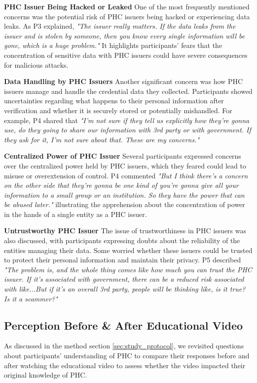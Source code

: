 \textbf{PHC Issuer Being Hacked or Leaked} One of the most frequently mentioned concerns was the potential risk of PHC issuers being hacked or experiencing data leaks. As P3 explained, \textit{"The issuer really matters. If the data leaks from the issuer and is stolen by someone, then you know every single information will be gone, which is a huge problem."} It highlights participants' fears that the concentration of sensitive data with PHC issuers could have severe consequences for malicious attacks.

\textbf{Data Handling by PHC Issuers} Another significant concern was how PHC issuers manage and handle the credential data they collected. Participants showed uncertainties regarding what happens to their personal information after verification and whether it is securely stored or potentially mishandled. For example, P4 shared that \textit{"I'm not sure if they tell us explicitly how they're gonna use, do they going to share our information with 3rd party or with government. If they ask for it, I'm not sure about that. These are my concerns."}

\textbf{Centralized Power of PHC Issuer} Several participants expressed concerns over the centralized power held by PHC issuers, which they feared could lead to misuse or overextension of control. P4 commented \textit{"But I think there's a concern on the other side that they're gonna be one kind of you're gonna give all your information to a small group or an institution. So they have the power that can be abused later."} illustrating the apprehension about the concentration of power in the hands of a single entity as a PHC issuer.

\textbf{Untrustworthy PHC Issuer} The issue of trustworthiness in PHC issuers was also discussed, with participants expressing doubts about the reliability of the entities managing their data. Some worried whether these issuers could be trusted to protect their personal information and maintain their privacy. P5 described \textit{"The problem is, and the whole thing comes like how much you can trust the PHC issuer. If it's associated with government, there can be a reduced risk associated with like...But if it's an overall 3rd party, people will be thinking like, is it true? Is it a scammer?"}

\subsection{Perception Before \& After Educational Video}
As discussed in the method section \ref{sec:study_protocol}, we revisited questions about participants' understanding of PHC to compare their responses before and after watching the educational video to assess whether the video impacted their original knowledge of PHC. 

